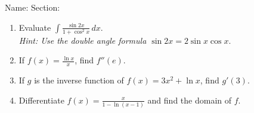 \documentclass[12pt]{article}
\begin{document}
\noindent Name: \hspace{4in}Section:
\vspace{0.5cm}



\begin{enumerate}
\item Evaluate $\int \frac{\sin{2x}}{1+\cos^2{x}} \,dx$. \\[1em]
\textit{Hint: Use the double angle formula $\sin{2x}=2 \sin{x} \cos{x}$}. \vfill



\item
If $f(x)=\frac{\ln{x}}{x}$, find $f''(e)$.
\vfill
\newpage
\item
If $g$ is the inverse function of $f(x)= 3x^2+ \ln{x}$, find $g'(3)$.


\vfill

\item Differentiate $f(x)=\frac{x}{1-\ln{(x-1)}}$ and find the domain of $f$.
\vfill




\end{enumerate}
\end{document}
